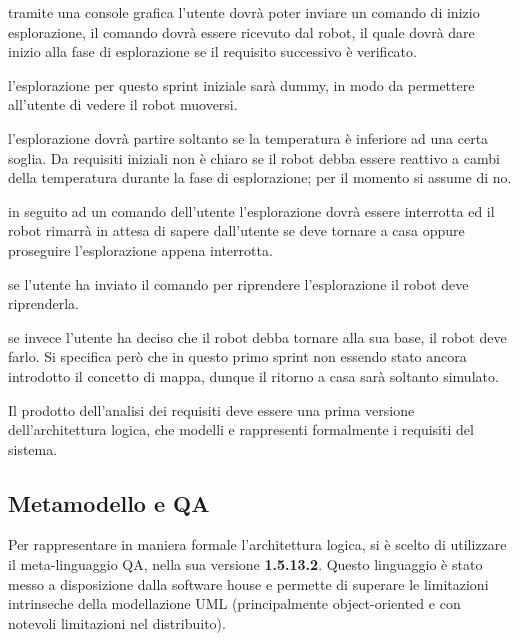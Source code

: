 \begin{description}[itemsep=1em]
  \item[\requirementref{R-startExplore}]
    tramite una console grafica l'utente dovrà poter inviare un comando di inizio esplorazione, il comando dovrà essere ricevuto dal robot, il quale dovrà dare inizio alla fase di esplorazione se il requisito successivo è verificato.
  \item[\requirementref{R-explore}]
    l'esplorazione per questo sprint iniziale sarà dummy, in modo da permettere all'utente di vedere il robot muoversi.
  \item[\requirementref{R-tempOk}]
    l'esplorazione dovrà partire soltanto se la temperatura è inferiore ad una certa soglia.
    Da requisiti iniziali non è chiaro se il robot debba essere reattivo a cambi della temperatura durante la fase di esplorazione;
    per il momento si assume di no.
  \item[\requirementref{R-stopExplore}]
    in seguito ad un comando dell'utente l'esplorazione dovrà essere interrotta ed il robot rimarrà in attesa di sapere dall'utente se deve tornare a casa oppure proseguire l'esplorazione appena interrotta.
  \item[\requirementref{R-continueExplore}]
    se l'utente ha inviato il comando per riprendere l'esplorazione il robot deve riprenderla.
  \item[\requirementref{R-backHome}]
    se invece l'utente ha deciso che il robot debba tornare alla sua base, il robot deve farlo.
    Si specifica però che in questo primo sprint non essendo stato ancora introdotto il concetto di mappa, dunque il ritorno a casa sarà soltanto simulato.
\end{description}

Il prodotto dell'analisi dei requisiti deve essere una prima versione dell'architettura logica, che modelli e rappresenti formalmente i requisiti del sistema.

\subsection{Metamodello e QA}

Per rappresentare in maniera formale l'architettura logica, si è scelto di utilizzare il meta-linguaggio QA, nella sua versione \textbf{1.5.13.2}.
Questo linguaggio è stato messo a disposizione dalla software house e permette di superare le limitazioni intrinseche della modellazione UML
(principalmente object-oriented e con notevoli limitazioni nel distribuito).

